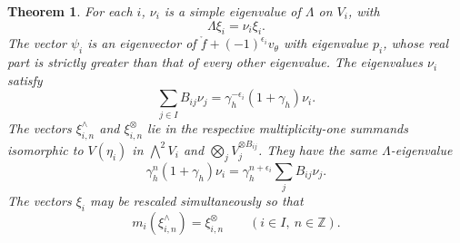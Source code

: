 \documentclass[11pt,leqno]{amsart}
\numberwithin{equation}{section}
\theoremstyle{plain}
\newtheorem{theorem}{Theorem}[section]
\theoremstyle{definition}
\theoremstyle{plain}
\theoremstyle{definition}
\theoremstyle{remark}
\begin{document}
\begin{theorem}\label{thm:Kostant-PF-Plucker}
For each $i$, $\nu_i$ is a simple eigenvalue of $\Lambda$ on $V_i$, with
\begin{equation}\label{eq:index-zero-eigenpair}
 \Lambda\xi_i=\nu_i\xi_i.
\end{equation}
The vector $\psi_i$ is an eigenvector of $\mathring f+(-1)^{\epsilon_i}v_\theta$ with eigenvalue $p_i$, whose real part is strictly greater than that of every other eigenvalue.  The eigenvalues $\nu_i$ satisfy
\begin{equation}\label{eq:oriented-cyclic-eigenvalues}
 \sum_{j\in I}B_{ij}\nu_j
 =\gamma_h^{-\epsilon_i}(1+\gamma_h)\nu_i.
\end{equation}
The vectors $\xi_{i,n}^{\wedge}$ and $\xi_{i,n}^{\otimes}$ lie in the respective multiplicity-one summands isomorphic to $V(\eta_i)$ in $\bigwedge^2V_i$ and $\bigotimes_jV_j^{\otimes B_{ij}}$.  They have the same $\Lambda$-eigenvalue
\begin{equation}\label{eq:integral-edge-eigenvalue}
 \gamma_h^n(1+\gamma_h)\nu_i
 =\gamma_h^{n+\epsilon_i}\sum_jB_{ij}\nu_j.
\end{equation}
The vectors $\xi_i$ may be rescaled simultaneously so that
\begin{equation}\label{eq:normalized-cyclic-Plucker-vector}
 m_i(\xi_{i,n}^{\wedge})=\xi_{i,n}^{\otimes}
 \qquad(i\in I,\ n\in\mathbb Z).
\end{equation}
\end{theorem}
\end{document}
